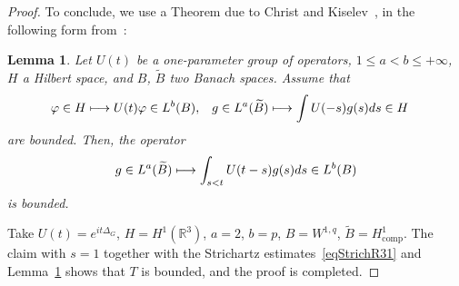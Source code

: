 \documentclass[10pt]{amsart}
\newtheorem{lemm}[theo]{Lemma}\newtheorem{prop}[theo]{Proposition}\newtheorem{coro}[theo]{Corollary}\newtheorem{conj}[theo]{Conjecture}
\theoremstyle{definition}\newtheorem{defi}[theo]{Definition}\newtheorem{rema}[theo]{Remark}\newtheorem{exam}[theo]{Example}\newtheorem{exem}[theo]{Example}\newtheorem{nota}[theo]{Notation}
\newcommand*\R{\mathbb{R}}
\DeclareMathOperator{\comp}{comp}
\let\oldmapsto\mapsto
\renewcommand*{\mapsto}{\mathchoice{\longmapsto}{\oldmapsto}{\oldmapsto}{\oldmapsto}}
\begin{document}
\begin{proof}
To conclude, we use a Theorem due to Christ and Kiselev~\cite{ChKi01}, in the following form from~\cite[Lemma~5.6]{PV1}:
\begin{lemm} \label{lem:CK}
Let $U(t)$ be a one-parameter group of operators, $1\leq a < b \leq +\infty$, $H$ a Hilbert space, and $B$, $\widetilde B$ two Banach spaces. Assume that
\begin{align*}
&\varphi \in H \mapsto U(t) \varphi \in L^b(B), &&g \in L^a(\widetilde B) \mapsto \int U(-s)g(s) ds \in H
\end{align*}
are bounded. Then, the operator
\[
g \in L^a(\widetilde B) \mapsto \int_{s<t} U(t-s)g(s) ds \in L^b(B)
\]
is bounded.
\end{lemm} Take $U(t) = e^{it\Delta_G}$, $H = H^1(\R^3)$, $a=2$, $b = p$, $B=W^{1,q}$, $\widetilde B = H^{1}_{\comp}$. The claim with $s=1$ together with the Strichartz estimates~\eqref{eqStrichR31} and Lemma~\ref{lem:CK} shows that $T$ is bounded, and the proof is completed.
\end{proof}
\end{document}
